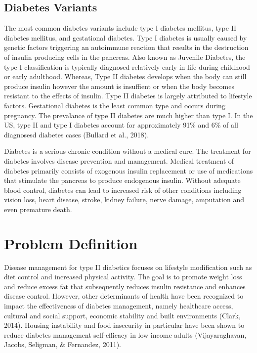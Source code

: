 \documentclass [11pt, proquest] {uwthesis}[2015/03/03]
\begin{document}
\subsection{Diabetes Variants}\label{diabetes-variants}

The most common diabetes variants include type I diabetes mellitus, type
II diabetes mellitus, and gestational diabetes. Type I diabetes is
usually caused by genetic factors triggering an autoimmune reaction that
results in the destruction of insulin producing cells in the pancreas.
Also known as Juvenile Diabetes, the type I classification is typically
diagnosed relatively early in life during childhood or early adulthood.
Whereas, Type II diabetes develops when the body can still produce
insulin however the amount is insuffient or when the body becomes
resistant to the effects of insulin. Type II diabetes is largely
attributed to lifestyle factors. Gestational diabetes is the least
common type and occurs during pregnancy. The prevalance of type II
diabetes are much higher than type I. In the US, type II and type I
diabetes account for approximately 91\% and 6\% of all diagnosesd
diabetes cases (Bullard et al., 2018).

Diabetes is a serious chronic condition without a medical cure. The
treatment for diabetes involves disease prevention and management.
Medical treatment of diabetes primarily consists of exogenous insulin
replacement or use of medications that stimulate the pancreas to produce
endogenous insulin. Without adequate blood control, diabetes can lead to
increased risk of other conditions including vision loss, heart disease,
stroke, kidney failure, nerve damage, amputation and even premature
death.

\section{Problem Definition}\label{problem-definition}

Disease management for type II diabetics focuses on lifestyle
modification such as diet control and increased physical activity. The
goal is to promote weight loss and reduce excess fat that subsequently
reduces insulin resistance and enhances disease control. However, other
determinants of health have been recognized to impact the effectiveness
of diabetes management, namely healthcare access, cultural and social
support, economic stability and built environments (Clark, 2014).
Housing instability and food insecurity in particular have been shown to
reduce diabetes management self-efficacy in low income adults
(Vijayaraghavan, Jacobs, Seligman, \& Fernandez, 2011).
\end{document}

